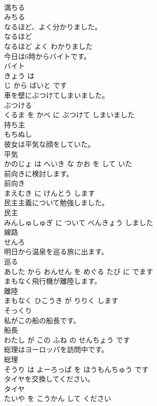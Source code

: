 \documentclass[8pt]{extreport}
\begin{document}
\begin{CJK}{UTF8}{min}
\\	満ちる	
\\	みちる			
\\	なるほど、よく分かりました。	
\\	なるほど 
\\	なるほど よく わかりました			
\\	今日は6時からバイトです。	
\\	バイト 
\\	きょう は 
\\	じ から ばいと です			
\\	車を壁にぶつけてしまいました。	
\\	ぶつける 
\\	くるま を かべ に ぶつけて しまいました			
\\	持ち主	
\\	もちぬし			
\\	彼女は平気な顔をしていた。	
\\	平気 
\\	かのじょ は へいき な かお を して いた			
\\	前向きに検討します。	
\\	前向き 
\\	まえむき に けんとう します			
\\	民主主義について勉強しました。	
\\	民主 
\\	みんしゅしゅぎ に ついて べんきょう しました			
\\	線路	
\\	せんろ			
\\	明日から温泉を巡る旅に出ます。	
\\	巡る 
\\	あした から おんせん を めぐる たび に でます			
\\	まもなく飛行機が離陸します。	
\\	離陸 
\\	まもなく ひこうき が りりく します			
\\	そっくり	
\\	私がこの船の船長です。	
\\	船長 
\\	わたし が この ふね の せんちょう です			
\\	総理はヨーロッパを訪問中です。	
\\	総理 
\\	そうり は よーろっぱ を ほうもんちゅう です			
\\	タイヤを交換してください。	
\\	タイヤ 
\\	たいや を こうかん して ください			

\end{CJK}
\end{document}
